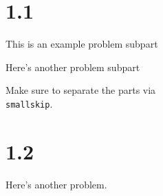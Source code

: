 \documentclass[11pt]{article} %
\newcommand{\problem}[1]{\section{#1}}		%
\begin{document}
\centerline{\LARGE\thishw}

\problem{1.1}
 This is an example problem subpart

\smallskip

 Here's another problem subpart

\smallskip

 Make sure to separate the parts via \texttt{\\smallskip}.

\problem{1.2}

 Here's another problem.
\end{document}

